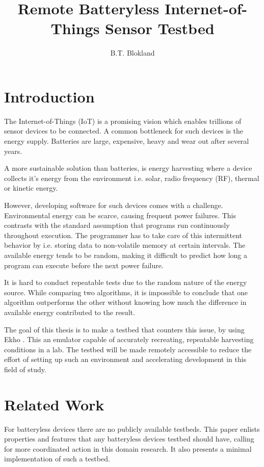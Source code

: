 \documentclass[]{article}
\title{Remote Batteryless Internet-of-Things Sensor Testbed}
\author{B.T. Blokland}
\begin{document}
\maketitle

\section{Introduction}

The Internet-of-Things (IoT) is a promising vision which enables trillions of sensor devices to be connected. A common bottleneck for such devices is the energy supply. Batteries are large, expensive, heavy and wear out after several years.

A more sustainable solution than batteries, is energy harvesting where a device collects it's energy from the environment i.e. solar, radio frequency (RF), thermal or kinetic energy.

However, developing software for such devices comes with a challenge. Environmental energy can be scarce, causing frequent power failures. This contrasts with the standard assumption that programs run continuously throughout execution. The programmer has to take care of this intermittent behavior by i.e. storing data to non-volatile memory at certain intervals. The available energy tends to be random, making it difficult to predict how long a program can execute before the next power failure. 

It is hard to conduct repeatable tests due to the random nature of the energy source. While comparing two algorithms, it is impossible to conclude that one algorithm outperforms the other without knowing how much the difference in available energy contributed to the result.

The goal of this thesis is to make a testbed that counters this issue, by using Ekho \cite{ekho}. This an emulator capable of accurately recreating, repeatable harvesting conditions in a lab. The testbed will be made remotely accessible to reduce the effort of setting up such an environment and accelerating development in this field of study.
 
\section{Related Work}

For batteryless devices there are no publicly available testbeds. This paper \cite{request} enlists properties and features that any batteryless devices testbed should have, calling for more coordinated action in this domain research. It also presents a minimal implementation of such a testbed.
\end{document}

